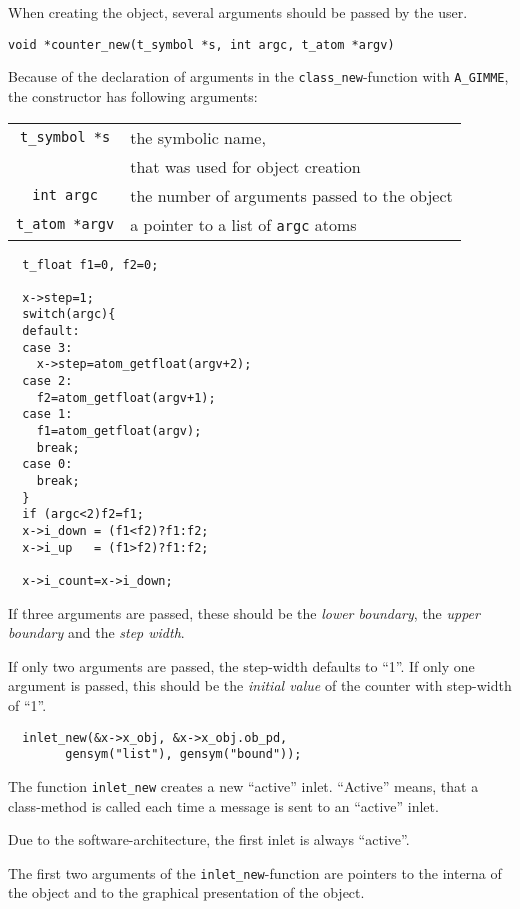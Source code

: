 \documentclass[12pt, a4paper,english,titlepage]{article}
\begin{document}
When creating the object, several arguments should be passed by the user.

\begin{verbatim}
void *counter_new(t_symbol *s, int argc, t_atom *argv)
\end{verbatim}
Because of the declaration of arguments in the \verb+class_new+-function
with \verb+A_GIMME+,
the constructor has following arguments:

\begin{tabular}{c|l}
\verb+t_symbol *s+ & the symbolic name,\\
& that was used for object creation \\
\verb+int argc+ & the number of arguments passed to the object\\
\verb+t_atom *argv+ & a pointer to a list of {\tt argc} atoms
\end{tabular}

\begin{verbatim}
  t_float f1=0, f2=0;

  x->step=1;
  switch(argc){
  default:
  case 3:
    x->step=atom_getfloat(argv+2);
  case 2:
    f2=atom_getfloat(argv+1);
  case 1:
    f1=atom_getfloat(argv);
    break;
  case 0:
    break;
  }
  if (argc<2)f2=f1;
  x->i_down = (f1<f2)?f1:f2;
  x->i_up   = (f1>f2)?f1:f2;

  x->i_count=x->i_down;
\end{verbatim}

If three arguments are passed, these should be the {\em lower boundary},
the {\em upper boundary} and the {\em step width}.

If only two arguments are passed, the step-width defaults to ``1''.
If only one argument is passed, this should be the {\em initial value} of the counter with
step-width of ``1''.

\begin{verbatim}
  inlet_new(&x->x_obj, &x->x_obj.ob_pd,
        gensym("list"), gensym("bound"));
\end{verbatim}

The function \verb+inlet_new+ creates a new ``active'' inlet.
``Active'' means, that a class-method is called each time
a message is sent to an ``active'' inlet.

Due to the software-architecture, the first inlet is always ``active''.

The first two arguments of the \verb+inlet_new+-function are
pointers to the interna of the object and to the graphical presentation of the object.
\end{document}
